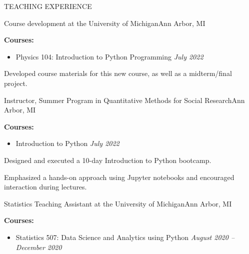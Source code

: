 \documentclass{resume} %
\begin{document}
\begin{rSection}{TEACHING EXPERIENCE} 
%
\begin{rSubsection}{Course development at the University of Michigan}{Ann Arbor, MI}{}{}
\item \textbf{Courses:}
%
    \begin{itemize}[itemsep=-0.4em]
        \vspace*{-0.5em}
        \item Physics 104: Introduction to Python Programming \hfill \textit{July 2022}
    \end{itemize}

\item Developed course materials for this new course, as well as a midterm/final project.

\end{rSubsection} 
%
\begin{rSubsection}{Instructor, Summer Program in Quantitative Methods for Social Research}{Ann Arbor, MI}{}{}
\item \textbf{Courses:}
%
    \begin{itemize}[itemsep=-0.4em]
        \vspace*{-0.5em}
        \item Introduction to Python \hfill \textit{July 2022}
    \end{itemize}

\item Designed and executed a 10-day Introduction to Python bootcamp.

\item Emphasized a hands-on approach using Jupyter notebooks and encouraged interaction during lectures. 

\end{rSubsection} 
%
\begin{rSubsection}{Statistics Teaching Assistant at the University of Michigan}{Ann Arbor, MI}{}{}
\item \textbf{Courses:}
%
    \begin{itemize}[itemsep=-0.4em]
        \vspace*{-0.5em}
        \item Statistics 507: Data Science and Analytics using Python \hfill \textit{August 2020 -- December 2020}
    \end{itemize}


\end{rSubsection}
\end{rSection}
\end{document}
